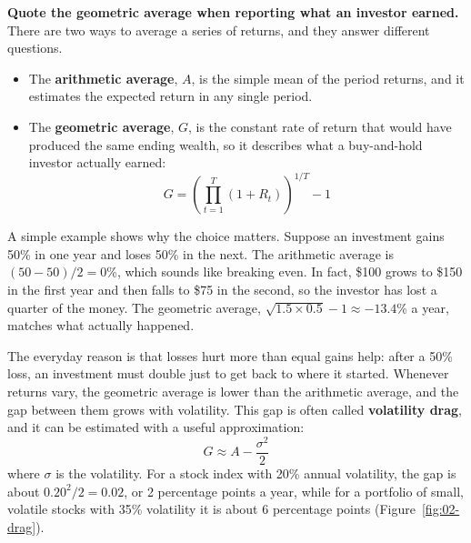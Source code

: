 \textbf{Quote the geometric average when reporting what an investor earned.} There are two ways to average a series of returns, and they answer different questions.

\begin{itemize}
  \item The \textbf{arithmetic average}, $A$, is the simple mean of the period returns, and it estimates the expected return in any single period.
  \item The \textbf{geometric average}, $G$, is the constant rate of return that would have produced the same ending wealth, so it describes what a buy-and-hold investor actually earned:
  \begin{equation}
    G = \left(\prod_{t=1}^{T} (1 + R_t)\right)^{1/T} - 1
    \label{eq:02-geometric}
  \end{equation}
\end{itemize}

A simple example shows why the choice matters. Suppose an investment gains 50\% in one year and loses 50\% in the next. The arithmetic average is $(50 - 50)/2 = 0$\%, which sounds like breaking even. In fact, \$100 grows to \$150 in the first year and then falls to \$75 in the second, so the investor has lost a quarter of the money. The geometric average, $\sqrt{1.5 \times 0.5} - 1 \approx -13.4$\% a year, matches what actually happened.

The everyday reason is that losses hurt more than equal gains help: after a 50\% loss, an investment must double just to get back to where it started. Whenever returns vary, the geometric average is lower than the arithmetic average, and the gap between them grows with volatility. This gap is often called \textbf{volatility drag}, and it can be estimated with a useful approximation:
\begin{equation}
  G \approx A - \frac{\sigma^2}{2}
  \label{eq:02-drag}
\end{equation}
where $\sigma$ is the volatility. For a stock index with 20\% annual volatility, the gap is about $0.20^2/2 = 0.02$, or 2 percentage points a year, while for a portfolio of small, volatile stocks with 35\% volatility it is about 6 percentage points (Figure~\ref{fig:02-drag}).



